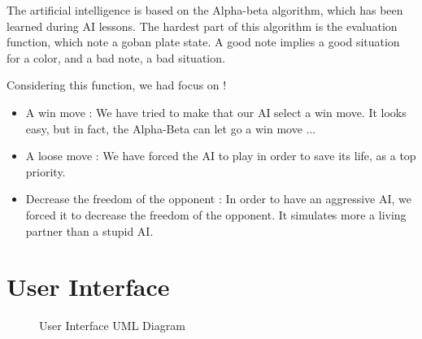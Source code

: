 \documentclass[12pt,a4paper,utf8x]{report}
\begin{document}
\begin{onehalfspace}
	The artificial intelligence is based on the Alpha-beta algorithm, which has been learned during AI lessons. The hardest part of this algorithm is the evaluation function, which note a goban plate state. A good note implies a good situation for a color, and a bad note, a bad situation.

	Considering this function, we had focus on !
\begin{itemize}
\item A win move : We have tried to make that our AI select a win move. It looks easy, but in fact, the Alpha-Beta can let go a win move ...
\item A loose move : We have forced the AI to play in order to save its life, as a top priority.
\item Decrease the freedom of the opponent : In order to have an aggressive AI, we forced it to decrease the freedom of the opponent. It simulates more a living partner than a stupid AI.
\end{itemize}
	
	\section{User Interface}

	\begin{figure}[!]
  		\begin{center}
  		\end{center}
  		\caption{User Interface UML Diagram}
	\end{figure}


\end{onehalfspace}
\end{document}

